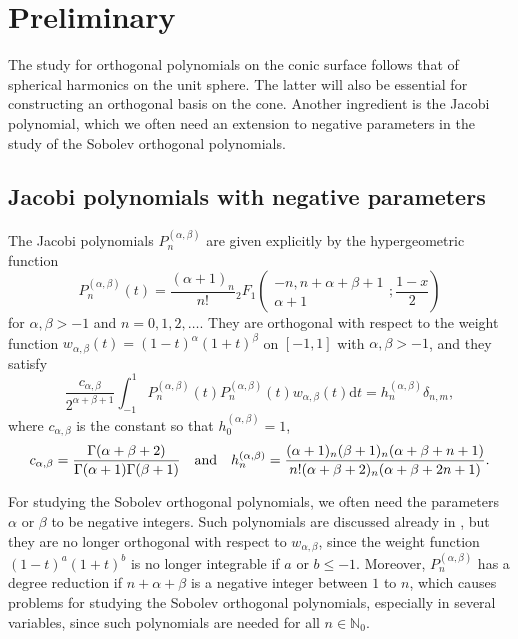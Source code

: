 \documentclass{amsart}
\theoremstyle{remark}
\def\d{\mathrm{d}}
\def\a{{\alpha}}
\def\b{{\beta}}
\def\NN{{\mathbb N}}
\begin{document}
\section{Preliminary}
\setcounter{equation}{0}

The study for orthogonal polynomials on the conic surface follows that of spherical harmonics on the unit
sphere. The latter will also be essential for constructing an orthogonal basis on the cone.
Another ingredient is the Jacobi polynomial, which we often need an extension to negative parameters
in the study of the Sobolev orthogonal polynomials.

\subsection{Jacobi polynomials with negative parameters}
The Jacobi polynomials $P_n^{(\a,\b)}$ are given explicitly by the hypergeometric function
\begin{equation}\label{eq:2F1Jacobi}
P_n^{(\a,\b)}(t) = \frac{(\a+1)_n}{n!} {}_2F_1 \left( \begin{matrix}-n, n+\a+\b+1 \\ \a+1\end{matrix}; \frac{1-x}{2}\right)
\end{equation}
for $\a,\b > -1$ and $n = 0, 1, 2, \ldots$. They are orthogonal with respect to the weight function
$w_{\a,\b}(t) = (1-t)^\a (1+t)^\b$ on $[-1,1]$ with $\a, \b > -1$, and they satisfy
$$
   \frac{c_{\a,\b}}{2^{\a+\b+1}}\int_{-1}^1 P_n^{(\a,\b)}(t) P_n^{(\a,\b)}(t) w_{\a,\b}(t) \d t = h_n^{(\a,\b)} \delta_{n,m},
$$
where $c_{\a,\b}$ is the constant so that $h_0^{(\a,\b)} =1$,
\begin{equation}\label{JacobiNorm}
  c_{\a,\b} = \frac{\Gamma(\a+\b+2)}{\Gamma(\a+1)\Gamma(\b+1)} \quad\hbox{and}\quad  h_n^{(\a,\b)}
    = \frac{(\a+1)_n(\b+1)_n (\a+\b+n+1)}{n!(\a+\b+2)_n (\a+\b+2n+1)}.
\end{equation}

For studying the Sobolev orthogonal polynomials, we often need the parameters $\a$ or $\b$ to be
negative integers. Such polynomials are discussed already in \cite{Sz}, but they are no longer orthogonal
with respect to $w_{\a,\b}$, since the weight function $(1-t)^a(1+t)^{b}$ is no longer integrable if $a$ or
$b \le -1$. Moreover, $P_n^{(\a,\b)}$ has a degree reduction if $n+\a+\b$ is a negative integer between
$1$ to $n$, which causes problems for studying the Sobolev orthogonal polynomials, especially in several
variables, since such polynomials are needed for all $n \in \NN_0$.
\end{document}
